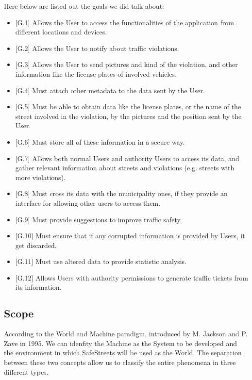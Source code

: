 Here below are listed out the goals we did talk about:

\begin{itemize}
\item {[G.1]} Allows the User to access the functionalities of the application from different locations and devices.
\item {[G.2]} Allows the User to notify about traffic violations.
\item {[G.3]} Allows the User to send pictures and kind of the violation, and other information like the license plates of involved vehicles.
\item {[G.4]} Must attach other metadata to the data sent by the User.
\item {[G.5]} Must be able to obtain data like the license plates, or the name of the street involved in the violation, by the pictures and the position sent by the User.
\item {[G.6]} Must store all of these information in a secure way.
\item {[G.7]} Allows both normal Users and authority Users to access its data, and gather relevant information about streets and violations (e.g. streets with more violations).
\item {[G.8]} Must cross its data with the municipality ones, if they provide an interface for allowing other users to access them.
\item {[G.9]} Must provide suggestions to improve traffic safety.
\item {[G.10]} Must ensure that if any corrupted information is provided by Users, it get discarded.
\item {[G.11]} Must use altered data to provide statistic analysis.
\item {[G.12]} Allows Users with authority permissions to generate traffic tickets from its information.   


\end{itemize}

\subsection{Scope}
    According to the World and Machine paradigm, introduced by M. Jackson and P. Zave in 1995. We can idenfity the Machine as the System to be developed and the environment in which SafeStreets will be used as the World. The separation between these two concepts allow us to classify the entire phenomena in three different types.
    \vspace{0.5cm}
    
